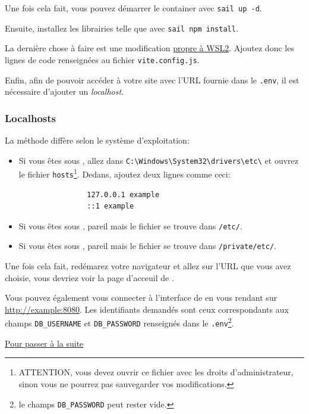         Une fois cela fait, vous pouvez démarrer le container avec \verb|sail up -d|.

        Ensuite, installez les librairies \js{} telle que \vite{} avec \verb|sail npm install|.

        La dernière chose à faire est une modification \href{https://laravel.com/docs/10.x/vite#configuring-hmr-in-sail-on-wsl2}{propre à WSL2}. Ajoutez donc les lignes de code renseignées au fichier \verb|vite.config.js|.

        Enfin, afin de pouvoir accéder à votre site avec l'URL fournie dans le \verb|.env|, il est nécessaire d'ajouter un \textit{localhost}.

        \subsubsection[Localhosts][fr.wikipedia.org/wiki/Localhost]{Localhosts\label{sec:localhost}}
        La méthode diffère selon le système d'exploitation:
        \begin{itemize}
            \item Si vous êtes sous \windows{}, allez dans \verb|C:\Windows\System32\drivers\etc\| et ouvrez le fichier \verb|hosts|\footnote{ATTENTION, vous devez ouvrir ce fichier avec les droits d'administrateur, sinon vous ne pourrez pas sauvegarder vos modifications.}. Dedans, ajoutez deux lignes comme ceci:
            \begin{lstlisting}
                127.0.0.1 example
                ::1 example
            \end{lstlisting}
            \item Si vous êtes sous \linux{}, pareil mais le fichier se trouve dans \verb|/etc/|.
            \item Si vous êtes sous \macos{}, pareil mais le fichier se trouve dans \verb|/private/etc/|.
        \end{itemize}

        Une fois cela fait, redémarez votre navigateur et allez sur l'URL que vous avez choisie, vous devriez voir la page d'acceuil de \laravel{}.

        Vous pouvez également vous connecter à l'interface de \phpmyadmin{} en vous rendant sur \url{http://example:8080}. Les identifiants demandés sont ceux correspondants aux champs \verb|DB_USERNAME| et \verb|DB_PASSWORD| renseignés dans le \verb|.env|\footnote{le champs \verb|DB_PASSWORD| peut rester vide.}.

        \hyperref[sec:suite]{Pour passer à la suite}
    

